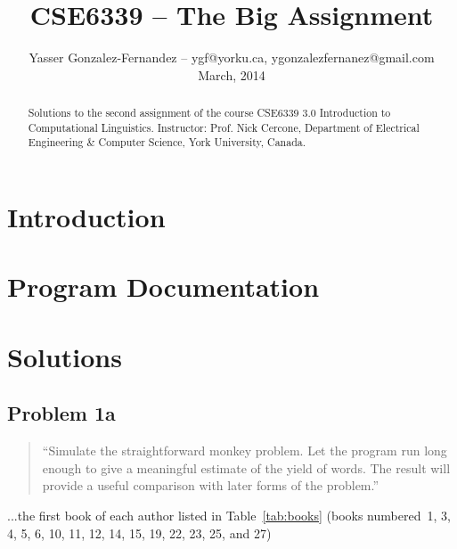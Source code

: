 \documentclass[conference]{IEEEtran}
\begin{document}
\title{CSE6339 -- The Big Assignment\vspace{-14pt}}
\author{Yasser Gonzalez-Fernandez -- ygf@yorku.ca, ygonzalezfernanez@gmail.com\vspace{4pt} \\ March, 2014}

\maketitle


\begin{abstract}
Solutions to the second assignment of the course CSE6339 3.0 Introduction to 
Computational Linguistics. Instructor: Prof. Nick Cercone, Department of 
Electrical Engineering \& Computer Science, York University, Canada.
\end{abstract}

\section{Introduction}


\section{Program Documentation}


\section{Solutions}

\subsection{Problem 1a}

\begin{quote}
``Simulate the straightforward monkey problem. Let the program run long enough to 
give a meaningful estimate of the yield of words. The result will provide a 
useful comparison with later forms of the problem.''
\end{quote}

...the first book of each author listed in Table~\ref{tab:books} (books numbered~1, 
3, 4, 5, 6, 10, 11, 12, 14, 15, 19, 22, 23, 25, and 27)

\begin{framed}
\fontsize{5.65}{6.78}\selectfont

\end{framed}
\end{document}
